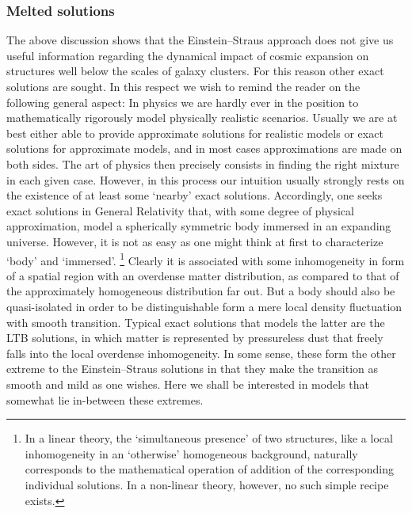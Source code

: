 \documentclass
[rmp,aps,twocolumn,showpacs,preprintnumbers,amsmath,amssymb]{revtex4}
\theoremstyle{plain}
\theoremstyle{definition}
\theoremstyle{remark}
\begin{document}
\subsubsection{Melted solutions}
\label{sec:MeltedSolutions}
%
The above discussion shows that the Einstein--Straus approach does not 
give us useful information regarding the dynamical impact of cosmic 
expansion on structures well below the scales of galaxy clusters.
For this reason other exact solutions are sought. In this respect 
we wish to remind the reader on the following general aspect: In physics 
we are hardly 
ever in the position to mathematically rigorously model physically 
realistic scenarios. Usually we are at best either able to provide 
approximate solutions for realistic models or exact solutions for 
approximate models, and in most cases approximations are made on 
both sides. The art of physics then precisely consists in finding the 
right mixture in each given case. However, in this process our 
intuition usually strongly rests on the existence of at least some 
`nearby' exact solutions. Accordingly, one seeks exact solutions in 
General Relativity that, with some degree of physical approximation, 
model a spherically symmetric body immersed in an expanding 
universe. However, it is not as easy as one might think at first to 
characterize `body' and `immersed'.%
\footnote{In a linear theory, the `simultaneous presence' of two  
structures, like a local inhomogeneity in an `otherwise' homogeneous
background, naturally corresponds to the mathematical operation of
addition of the corresponding individual solutions. In a non-linear 
theory, however, no such simple recipe exists.} 
Clearly it is associated with some inhomogeneity 
in form of a spatial region with an overdense matter distribution, as 
compared to that of the approximately homogeneous distribution far out. 
But a body should also be quasi-isolated in order to be distinguishable 
form a mere local density fluctuation with smooth transition. 
Typical exact solutions that models the latter are the LTB solutions, 
in which matter is represented by pressureless dust that freely falls 
into the local overdense inhomogeneity. In some sense, these form 
the other extreme to the Einstein--Straus solutions in that they 
make the transition as smooth and mild as one wishes. Here we shall 
be interested in models that somewhat lie in-between these extremes.
\end{document}
